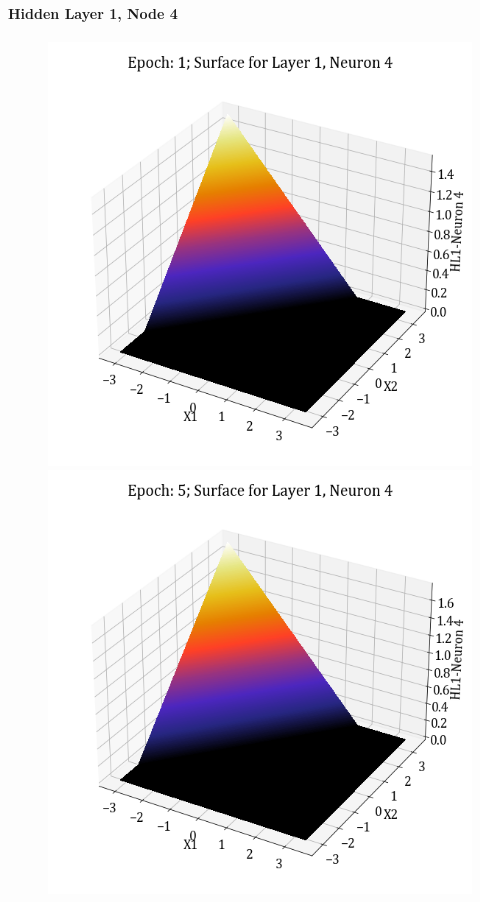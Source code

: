 \documentclass[11pt,a4paper]{article}
\begin{document}
\paragraph{Hidden Layer 1, Node 4}
\begin{figure}[H]
    \centering
    \includegraphics[scale=0.4]{images/1B_MLFFNN_E1_HL1_N4.png}
    \includegraphics[scale=0.4]{images/1B_MLFFNN_E5_HL1_N4.png}

\end{figure}
\end{document}
